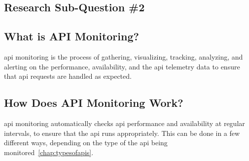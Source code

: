 \begin{multicols}{2}
      \section{Research Sub-Question \#2}
      \subsection{What is API Monitoring?}
      \acrshort{api} monitoring is the process of gathering, visualizing, tracking, analyzing, and alerting on the 
      performance, availability, and the \acrshort{api} telemetry data to ensure that \acrshort{api} requests are 
      handled as expected. 
      \subsection{How Does API Monitoring Work?}
      \acrshort{api} monitoring automatically checks \acrshort{api} performance and availability at regular intervals,
      to ensure that the \acrshort{api} runs appropriately. This can be done in a few different ways, depending on the
      type of the \acrshort{api} being monitored~\ref{chap:typesofapis}.


\end{multicols}
